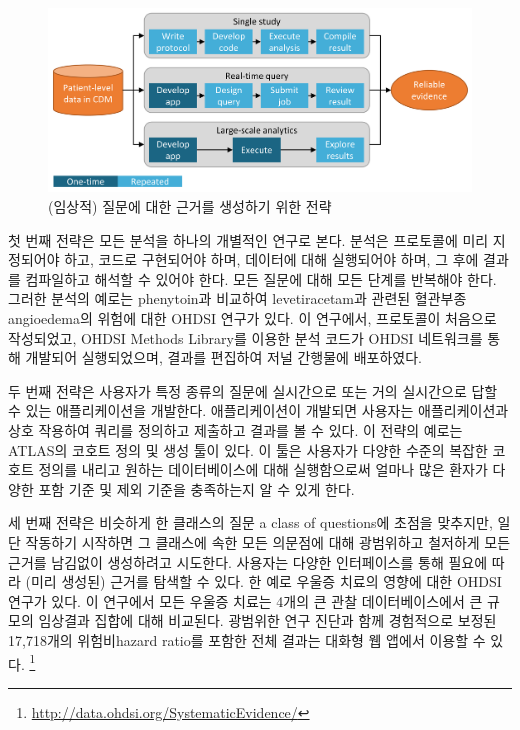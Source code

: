 \documentclass[10.5pt]{book}
\let\rmarkdownfootnote\footnote%
\def\footnote{\protect\rmarkdownfootnote}
\theoremstyle{definition}
\theoremstyle{definition}
\theoremstyle{definition}
\theoremstyle{remark}
\begin{document}
\begin{figure}

{\centering \includegraphics[width=0.9\linewidth]{images/OhdsiAnalyticsTools/strategies} 

}

\caption{(임상적) 질문에 대한 근거를 생성하기 위한 전략}\label{fig:strategies}
\end{figure}

첫 번째 전략은 모든 분석을 하나의 개별적인 연구로 본다. 분석은
프로토콜에 미리 지정되어야 하고, 코드로 구현되어야 하며, 데이터에 대해
실행되어야 하며, 그 후에 결과를 컴파일하고 해석할 수 있어야 한다. 모든
질문에 대해 모든 단계를 반복해야 한다. 그러한 분석의 예로는 phenytoin과
비교하여 levetiracetam과 관련된 혈관부종angioedema의 위험에 대한 OHDSI
연구가 있다. \citep{duke_2017} 이 연구에서, 프로토콜이 처음으로
작성되었고, OHDSI Methods Library를 이용한 분석 코드가 OHDSI 네트워크를
통해 개발되어 실행되었으며, 결과를 편집하여 저널 간행물에 배포하였다.

두 번째 전략은 사용자가 특정 종류의 질문에 실시간으로 또는 거의
실시간으로 답할 수 있는 애플리케이션을 개발한다. 애플리케이션이 개발되면
사용자는 애플리케이션과 상호 작용하여 쿼리를 정의하고 제출하고 결과를 볼
수 있다. 이 전략의 예로는 ATLAS의 코호트 정의 및 생성 툴이 있다. 이 툴은
사용자가 다양한 수준의 복잡한 코호트 정의를 내리고 원하는 데이터베이스에
대해 실행함으로써 얼마나 많은 환자가 다양한 포함 기준 및 제외 기준을
충족하는지 알 수 있게 한다.

세 번째 전략은 비슷하게 한 클래스의 질문 a class of questions에 초점을
맞추지만, 일단 작동하기 시작하면 그 클래스에 속한 모든 의문점에 대해
광범위하고 철저하게 모든 근거를 남김없이 생성하려고 시도한다. 사용자는
다양한 인터페이스를 통해 필요에 따라 (미리 생성된) 근거를 탐색할 수
있다. 한 예로 우울증 치료의 영향에 대한 OHDSI 연구가 있다.
\citep{schuemie_2018b} 이 연구에서 모든 우울증 치료는 4개의 큰 관찰
데이터베이스에서 큰 규모의 임상결과 집합에 대해 비교된다. 광범위한 연구
진단과 함께 경험적으로 보정된 17,718개의 위험비hazard ratio를 포함한
전체 결과는 대화형 웹 앱에서 이용할 수 있다. \footnote{\url{http://data.ohdsi.org/SystematicEvidence/}}
\end{document}
